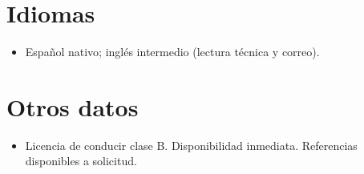 \documentclass[11pt,a4paper,sans]{moderncv}
\begin{document}

\section{Idiomas}
\vspace{1pt}
\begin{itemize}
\item {Español nativo; inglés intermedio (lectura técnica y correo).}
\end{itemize}


\section{Otros datos}
\vspace{1pt}
\begin{itemize}
\item {Licencia de conducir clase B. Disponibilidad inmediata. Referencias disponibles a solicitud.}
\end{itemize}
\end{document}
